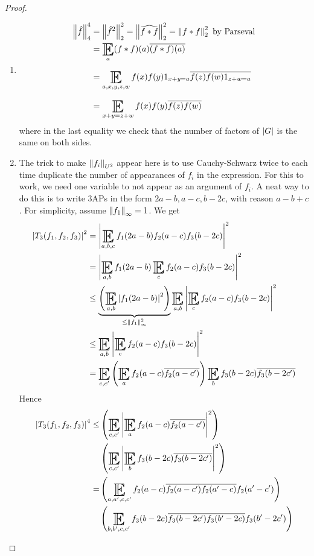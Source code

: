 \documentclass{article}
\begin{document}
\begin{proof}~
  \begin{enumerate}
    \item
    \begin{align*}
      \norm{\hat f}_4^4
      & = \norm{\hat f^2}_2^2 = \norm{\widehat{f \ast f}}_2^2 = \norm{f \ast f}_2^2 \text{ by Parseval} \\
      & = \E_a (f \ast f)(a) \overline{(f \ast f)(a)} \\
      & = \E_{a, x, y, z, w} f(x)f(y)1_{x + y = a} \overline{f(z)f(w)1_{z + w = a}} \\
      & = \E_{x + y = z + w} f(x)f(y)\overline{f(z)f(w)}
    \end{align*}
    where in the last equality we check that the number of factors of $\left\lvert G\right\rvert$ is the same on both sides.
    \newpage
    \item The trick to make $\left\lVert f_i\right\rVert_{U^2}$ appear here is to use Cauchy-Schwarz twice to each time duplicate the number of appearances of $f_i$ in the expression. For this to work, we need one variable to not appear as an argument of $f_i$. A neat way to do this is to write 3APs in the form $2a - b, a - c, b - 2c$, with reason $a - b + c$. For simplicity, assume $\left\lVert f_1\right\rVert_\infty = 1$. We get
    \begin{align*}
      \abs{T_3(f_1, f_2, f_3)}^2
      & = \abs{\E_{a, b, c} f_1(2a - b) f_2(a - c) f_3(b - 2c)}^2 \\
      & = \abs{\E_{a, b} f_1(2a - b) \E_c f_2(a - c) f_3(b - 2c)}^2 \\
      & \le \underbrace{\left(\E_{a, b} \abs{f_1(2a - b)}^2\right)}_{\le \norm{f_1}_\infty^2} \E_{a, b} \abs{\E_c f_2(a - c) f_3(b - 2c)}^2 \\
      & \le \E_{a, b} \abs{\E_c f_2(a - c) f_3(b - 2c)}^2 \\
      & = \E_{c, c'} \left(\E_a f_2(a - c) \overline{f_2(a - c')}\right) \E_b f_3(b - 2c) \overline{f_3(b - 2c')}
    \end{align*}
    Hence
    \begin{align*}
      \abs{T_3(f_1, f_2, f_3)}^4
      \le & \left(\E_{c, c'} \abs{\E_a f_2(a - c) \overline{f_2(a - c')}}^2\right) \\
      & \left(\E_{c, c'} \abs{\E_b f_3(b - 2c) \overline{f_3(b - 2c')}}^2\right) \\
      = & \left(\E_{a, a', c, c'} f_2(a - c) \overline{f_2(a - c') f_2(a' - c)} f_2(a' - c')\right) \\
      & \left(\E_{b, b', c, c'} f_3(b - 2c) \overline{f_3(b - 2c') f_3(b' - 2c)} f_3(b' - 2c')\right) \\

\end{align*}
\end{enumerate}
\end{proof}
\end{document}

